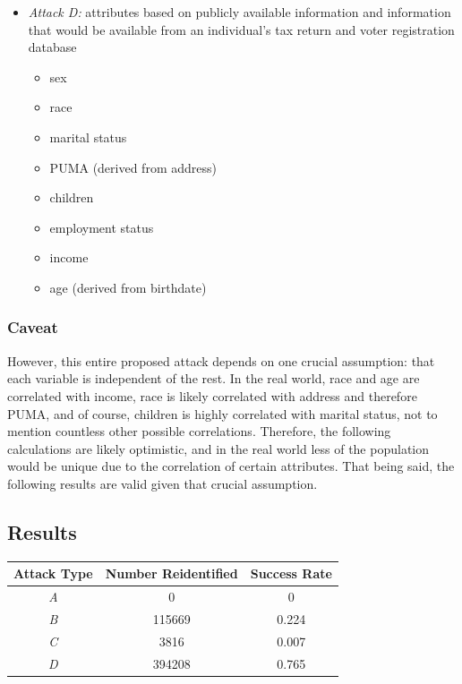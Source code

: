 \documentclass[12pt]{article}
\begin{document}
\begin{itemize}
\begin{itemize}
  \end{itemize}
  \item \textit{Attack D:} attributes based on publicly available information and information that would be available from an individual's tax return and voter registration database
  \begin{itemize}
    \item sex
    \item race
    \item marital status
    \item PUMA (derived from address)
    \item children
    \item employment status
    \item income
    \item age (derived from birthdate)
  \end{itemize}
\end{itemize}

\subsubsection{Caveat}

\noindent

However, this entire proposed attack depends on one crucial assumption: that each variable is independent of the rest. In the real world, race and age are correlated with income, race is likely correlated with address and therefore PUMA, and of course, children is highly correlated with marital status, not to mention countless other possible correlations. Therefore, the following calculations are likely optimistic, and in the real world less of the population would be unique due to the correlation of certain attributes. That being said, the following results are valid given that crucial assumption.

\subsection{Results}

\noindent

\begin{tabular}{|c|c|c|}
\hline
Attack Type & Number Reidentified & Success Rate \\ \hline
\textit{A} & 0 & 0 \\ \hline
\textit{B} & 115669 & 0.224 \\ \hline
\textit{C} & 3816 & 0.007 \\ \hline
\textit{D} & 394208 & 0.765 \\ \hline
\end{tabular}
\end{document}
